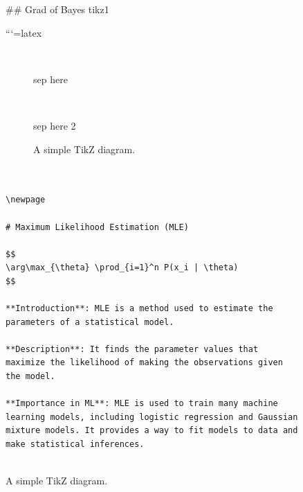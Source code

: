 \documentclass[
  12 pt,
  a4paper,
]{book}
\numberwithin{equation}{section}
\theoremstyle{plain}      %
\theoremstyle{definition} %
\theoremstyle{remark}     %
\theoremstyle{note}         %
\begin{document}
\begin{figure}
\centering
{}

## Grad of Bayes tikz1 

```{=latex}
\begin{figure}
\centering
{}
\

sep here 
\

\

sep here 2 
\





\caption{A simple TikZ diagram.}
\end{figure}

\begin{verbatim}


\newpage

# Maximum Likelihood Estimation (MLE)

$$
\arg\max_{\theta} \prod_{i=1}^n P(x_i | \theta)
$$

**Introduction**: MLE is a method used to estimate the parameters of a statistical model.

**Description**: It finds the parameter values that maximize the likelihood of making the observations given the model.

**Importance in ML**: MLE is used to train many machine learning models, including logistic regression and Gaussian mixture models. It provides a way to fit models to data and make statistical inferences.


\end{verbatim}
\end{figure}
\end{document}
